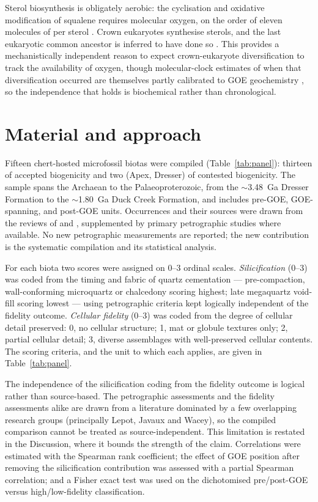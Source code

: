 \documentclass[11pt]{article}
\begin{document}
Sterol biosynthesis is obligately aerobic: the cyclisation and oxidative modification of squalene
requires molecular oxygen, on the order of eleven molecules of  per sterol
\citep{Gold2017,Desmond2009}. Crown eukaryotes synthesise sterols, and the last eukaryotic common
ancestor is inferred to have done so \citep{Desmond2009}. This provides a mechanistically independent
reason to expect crown-eukaryote diversification to track the availability of oxygen, though
molecular-clock estimates of when that diversification occurred are themselves partly calibrated to
GOE geochemistry \citep{Gold2017}, so the independence that holds is biochemical rather than
chronological.

\section{Material and approach}

Fifteen chert-hosted microfossil biotas were compiled (Table~\ref{tab:panel}): thirteen of accepted
biogenicity and two (Apex, Dresser) of contested biogenicity. The sample spans the Archaean to the
Palaeoproterozoic, from the $\sim$3.48~Ga Dresser Formation to the $\sim$1.80~Ga Duck Creek
Formation, and includes pre-GOE, GOE-spanning, and post-GOE units. Occurrences and their sources
were drawn from the reviews of \citet{Javaux2018} and \citet{Wacey2014}, supplemented by primary
petrographic studies where available. No new petrographic measurements are reported; the new
contribution is the systematic compilation and its statistical analysis.

For each biota two scores were assigned on 0--3 ordinal scales. \emph{Silicification} (0--3) was
coded from the timing and fabric of quartz cementation --- pre-compaction, wall-conforming
microquartz or chalcedony scoring highest; late megaquartz void-fill scoring lowest --- using
petrographic criteria kept logically independent of the fidelity outcome. \emph{Cellular fidelity}
(0--3) was coded from the degree of cellular detail preserved: 0, no cellular structure; 1, mat or
globule textures only; 2, partial cellular detail; 3, diverse assemblages with well-preserved
cellular contents. The scoring criteria, and the unit to which each applies, are given in
Table~\ref{tab:panel}.

The independence of the silicification coding from the fidelity outcome is logical rather than
source-based. The petrographic assessments and the fidelity assessments alike are drawn from a
literature dominated by a few overlapping research groups (principally Lepot, Javaux and Wacey), so
the compiled comparison cannot be treated as source-independent. This limitation is restated in the
Discussion, where it bounds the strength of the claim. Correlations were estimated with the Spearman
rank coefficient; the effect of GOE position after removing the silicification contribution was
assessed with a partial Spearman correlation; and a Fisher exact test was used on the dichotomised
pre/post-GOE versus high/low-fidelity classification.
\end{document}
